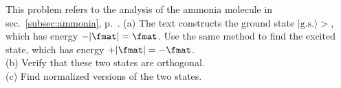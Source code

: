 This problem refers to the analysis of the ammonia molecule in sec.~\ref{subsec:ammonia}, p.~\pageref{subsec:ammonia}.
(a) The text constructs the ground state $|\text{g.s.}\rangle>$, which has energy $-|\fmat|=\fmat$. Use the
same method to find the excited state, which has energy $+|\fmat|=-\fmat$.\\
(b) Verify that these two states are orthogonal.\\
(c) Find normalized versions of the two states.

